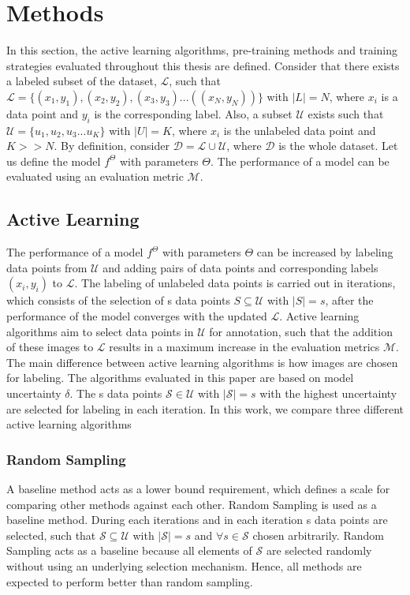 
\chapter{Methods}\label{chapter:methods}
In this section, the active learning algorithms, pre-training methods and training strategies evaluated throughout this thesis are defined. Consider that there exists a labeled subset of the dataset, $\mathcal{L}$, such that $\mathcal{L} = \{(x_1, y_1), (x_2, y_2), (x_3, y_3) ... ((x_N, y_N))\}$ with $|L| = N$, where $x_i$ is a data point and $y_i$ is the corresponding label. Also, a subset $\mathcal{U}$ exists such that $\mathcal{U} = \{u_1, u_2, u_3 ... u_K\}$ with $|U| = K$, where $x_i$ is the unlabeled data point and $K>>N$. By definition, consider $\mathcal{D} = \mathcal{L} \cup \mathcal{U}$, where $\mathcal{D}$ is the whole dataset. Let us define the model $f^\Theta$ with parameters $\Theta$. The performance of a model can be evaluated using an evaluation metric $\mathcal{M}$.

\section{Active Learning}\label{section:active_learning}
The performance of a model $f^\Theta$ with parameters $\Theta$ can be increased by labeling data points from $\mathcal{U}$ and adding pairs of data points and corresponding labels $(x_i, y_i)$ to $\mathcal{L}$. The labeling of unlabeled data points is carried out in iterations, which consists of the selection of s data points $S \subseteq \mathcal{U}$ with $|S| = s$, after the performance of the model converges with the updated $\mathcal{L}$. Active learning algorithms aim to select data points in $\mathcal{U}$ for annotation, such that the addition of these images to $\mathcal{L}$ results in a maximum increase in the evaluation metrics $\mathcal{M}$. The main difference between active learning algorithms is how images are chosen for labeling. The algorithms evaluated in this paper are based on model uncertainty $\delta$. The s data points $\mathcal{S} \in \mathcal{U}$ with $|\mathcal{S}| = s$ with the highest uncertainty are selected for labeling in each iteration. In this work, we compare three different active learning algorithms

\subsection{Random Sampling}
A baseline method acts as a lower bound requirement, which defines a scale for comparing other methods against each other. Random Sampling is used as a baseline method. During each iterations and in each iteration s data points are selected, such that $\mathcal{S} \subseteq \mathcal{U}$ with $|\mathcal{S}| = s$ and $\forall s \in \mathcal{S}$ chosen arbitrarily. Random Sampling acts as a baseline because all elements of $\mathcal{S}$ are selected randomly without using an underlying selection mechanism. Hence, all methods are expected to perform better than random sampling.

